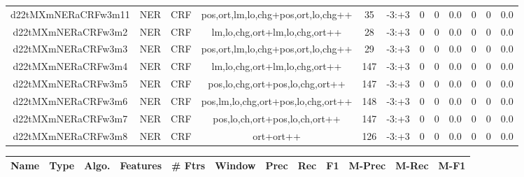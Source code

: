 \documentclass[a4paper]{article}
\begin{document}
\begin{landscape}
\begin{center}
\begin{tabular}{ |c|c|c|c|c|c|c|c|c|c|c|c|}
 
 	
 	\small{ d22tMXmNERaCRFw3m11 } & \small{ NER} & \small{  CRF }  & pos,ort,lm,lo,chg+pos,ort,lo,chg++  &  35 &  \small{  -3:+3 }  &  0 & 0 & 0.0  &  0 & 0 & 0.0 \\
 	

 
 	
 	\small{ d22tMXmNERaCRFw3m2 } & \small{ NER} & \small{  CRF }  & lm,lo,chg,ort+lm,lo,chg,ort++  &  28 &  \small{  -3:+3 }  &  0 & 0 & 0.0  &  0 & 0 & 0.0 \\
 	

 
 	
 	\small{ d22tMXmNERaCRFw3m3 } & \small{ NER} & \small{  CRF }  & pos,ort,lm,lo,chg+pos,ort,lo,chg++  &  29 &  \small{  -3:+3 }  &  0 & 0 & 0.0  &  0 & 0 & 0.0 \\
 	

 
 	
 	\small{ d22tMXmNERaCRFw3m4 } & \small{ NER} & \small{  CRF }  & lm,lo,chg,ort+lm,lo,chg,ort++  &  147 &  \small{  -3:+3 }  &  0 & 0 & 0.0  &  0 & 0 & 0.0 \\
 	

 
 	
 	\small{ d22tMXmNERaCRFw3m5 } & \small{ NER} & \small{  CRF }  & pos,lo,chg,ort+pos,lo,chg,ort++  &  147 &  \small{  -3:+3 }  &  0 & 0 & 0.0  &  0 & 0 & 0.0 \\
 	

 
 	
 	\small{ d22tMXmNERaCRFw3m6 } & \small{ NER} & \small{  CRF }  & pos,lm,lo,chg,ort+pos,lo,chg,ort++  &  148 &  \small{  -3:+3 }  &  0 & 0 & 0.0  &  0 & 0 & 0.0 \\
 	

 
 	
 	\small{ d22tMXmNERaCRFw3m7 } & \small{ NER} & \small{  CRF }  & pos,lo,ch,ort+pos,lo,ch,ort++  &  147 &  \small{  -3:+3 }  &  0 & 0 & 0.0  &  0 & 0 & 0.0 \\
 	

 
 	
 	\small{ d22tMXmNERaCRFw3m8 } & \small{ NER} & \small{  CRF }  & ort+ort++  &  126 &  \small{  -3:+3 }  &  0 & 0 & 0.0  &  0 & 0 & 0.0 \\
 	
 \hline
\end{tabular}
\end{center}




\begin{center}
\begin{tabular}{ |c|c|c|c|c|c|c|c|c|c|c|c|} 
 \hline
 	Name & Type & Algo. & Features & \# Ftrs & Window & Prec & Rec & F1 & M-Prec & M-Rec & M-F1\\
 \hline


\end{tabular}
\end{center}
\end{landscape}
\end{document}
